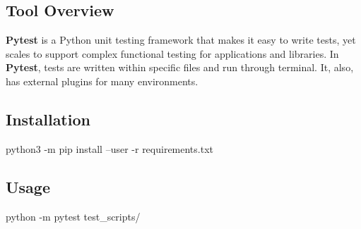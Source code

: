 \subsection{Tool Overview}
\textbf{Pytest} is a Python unit testing framework that makes it easy to write tests, yet scales to support complex functional testing for applications and libraries. In \textbf{Pytest}, tests are written within specific files and run through terminal.  It, also, has external plugins for many environments.

\subsection{Installation}
\begin{bash}
python3 -m pip install --user -r requirements.txt
\end{bash}

\subsection{Usage}
\begin{bash}
python -m pytest test_scripts/
\end{bash}
